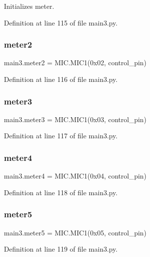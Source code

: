 Initializes meter. 



Definition at line 115 of file main3.\+py.

\mbox{\label{namespacemain3_aa252e5a293824baa2daad9b2dbef9b11}} 
\subsubsection{meter2}
{\footnotesize\ttfamily main3.\+meter2 = M\+I\+C.\+M\+I\+C1(0x02, control\+\_\+pin)}



Definition at line 116 of file main3.\+py.

\mbox{\label{namespacemain3_a70657f222edd8805f6f49ad404bd875a}} 
\subsubsection{meter3}
{\footnotesize\ttfamily main3.\+meter3 = M\+I\+C.\+M\+I\+C1(0x03, control\+\_\+pin)}



Definition at line 117 of file main3.\+py.

\mbox{\label{namespacemain3_a80e6d1df977908ba5ce55b4beb384ce6}} 
\subsubsection{meter4}
{\footnotesize\ttfamily main3.\+meter4 = M\+I\+C.\+M\+I\+C1(0x04, control\+\_\+pin)}



Definition at line 118 of file main3.\+py.

\mbox{\label{namespacemain3_aeda58cee300f9fae14d6fc3ca9891847}} 
\subsubsection{meter5}
{\footnotesize\ttfamily main3.\+meter5 = M\+I\+C.\+M\+I\+C1(0x05, control\+\_\+pin)}



Definition at line 119 of file main3.\+py.

\mbox{\label{namespacemain3_a750e986d76cf0b4ce563501efc1d8f74}} 
